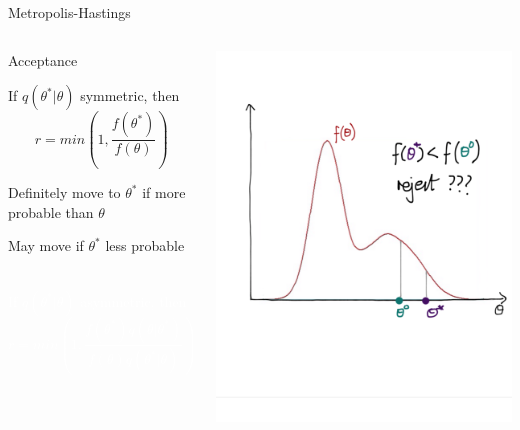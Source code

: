 \documentclass[compress]{beamer}
\begin{document}
\begin{frame}[label=sec-7-7]{Metropolis-Hastings}
    \begin{columns}[c] 
    \begin{block}{Acceptance}
        \begin{itemize}
            \item If $q(\theta^*|\theta)$ symmetric, then 
            $$ r = min \left( 1,\dfrac{f(\theta^*)}{f(\theta)} \right)$$ 
            \item Definitely move to $\theta^*$ if more probable than $\theta$ 
            \item May move if $\theta^*$ less probable \\~\\
            \textcolor{white}{
                \item[\color{white}] If $q(\theta^*|\theta)$ asymmetric, then $$ r = min \left( 1,\dfrac{f(\theta^*)q(\theta|\theta^*)}{f(\theta)q(\theta^*|\theta)} \right)$$
            }
        \end{itemize}
    \end{block}

    \includegraphics[width=1\linewidth]{MH4}
\end{columns}
\end{frame}
\end{document}
